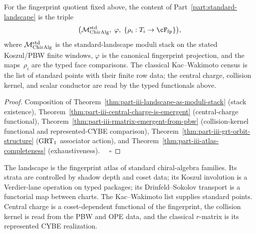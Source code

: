 \begin{proposition}
\label{prop:part-iii-landscape-restated}
For the fingerprint quotient fixed above, the content of Part~\ref{part:standard-landscape} is the
triple
\begin{equation}
 \bigl(\cM_{\ChirAlg}^{\mathrm{std}},\; \varphi,\; \{\rho_i:T_i\to\cF_{\mathrm{fp}}\}\bigr),
 \label{eq:part-iii-landscape-triple}
\end{equation}
where $\mathcal{M}_{\mathrm{ChirAlg}}^{\mathrm{std}}$ is the standard-landscape
moduli stack on the stated Koszul/PBW finite windows, $\varphi$ is
the canonical fingerprint projection, and the maps~$\rho_i$ are the
typed face comparisons. The classical Kac--Wakimoto census is the
list of standard points with their finite row data; the central
charge, collision kernel, and scalar conductor are read by the typed
functionals above.
\end{proposition}
\begin{proof}
Composition of
Theorem~\ref{thm:part-iii-landscape-as-moduli-stack} (stack
existence), Theorem~\ref{thm:part-iii-central-charge-is-emergent}
(central-charge functional),
Theorem~\ref{thm:part-iii-rmatrix-emergent-from-pbw}
(collision-kernel functional and represented-CYBE comparison),
Theorem~\ref{thm:part-iii-grt-orbit-structure}
($\mathrm{GRT}_1$ associator action), and
Theorem~\ref{thm:part-iii-atlas-completeness}
(exhaustiveness). $\quad\square$
\end{proof}

\medskip

The landscape is the fingerprint atlas of standard chiral-algebra
families. Its strata are controlled by shadow depth and coset data;
its Koszul involution is a Verdier-lane operation on typed packages;
its Drinfeld--Sokolov transport is a functorial map between charts.
The Kac--Wakimoto list supplies standard points. Central charge is a
coset-dependent functional of the fingerprint, the collision kernel is
read from the PBW and OPE data, and the classical $r$-matrix is its
represented CYBE realization.
